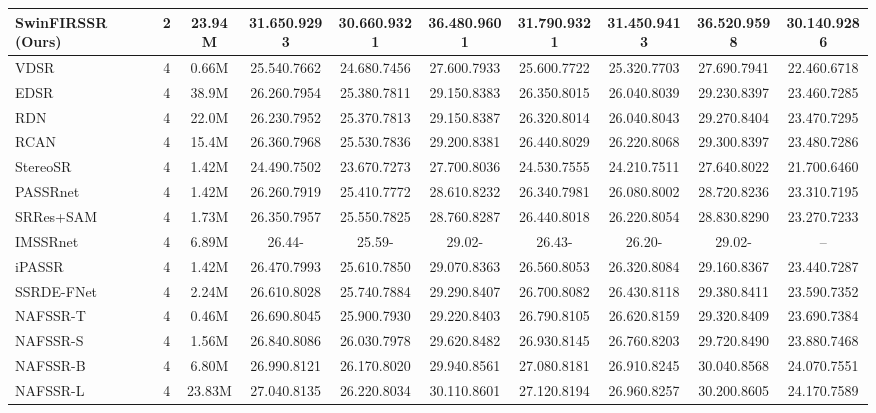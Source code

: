 \documentclass[10pt,twocolumn,letterpaper]{article}
\begin{document}
\begin{table*}[!t]
{\begin{tabular}{lccccccccc}
			\textbf{SwinFIRSSR} (Ours) & 2 & 23.94M  & {31.65}{0.9293} & {30.66}{0.9321} & {36.48}{0.9601} & {31.79}{0.9321} & {31.45}{0.9413} & {36.52}{0.9598} & {30.14}{0.9286} \\
			\midrule
			\midrule
			VDSR &  4 & 0.66M & 25.540.7662 & 24.680.7456 & 27.600.7933 & 25.600.7722 & 25.320.7703 & 27.690.7941 & 22.460.6718 \\
			EDSR &  4 & 38.9M & 26.260.7954 & 25.380.7811 & 29.15{0.8383} & 26.350.8015 & 26.040.8039 & 29.230.8397 & 23.460.7285 \\
			RDN &  4 & 22.0M  & 26.230.7952 & 25.370.7813 & 29.150.8387 & 26.320.8014 & 26.040.8043 & 29.27{0.8404} & 23.47{0.7295} \\
			RCAN &  4 & 15.4M & 26.360.7968 & 25.530.7836 & {29.20}0.8381 & 26.440.8029 & 26.220.8068 & {29.30}0.8397 & {23.48}0.7286 \\
			StereoSR  &  4 & 1.42M   & 24.490.7502 & 23.670.7273 &27.700.8036 & 24.530.7555 & 24.210.7511 & 27.640.8022 & 21.700.6460 \\
			PASSRnet  &  4 & 1.42M   & 26.260.7919 & 25.410.7772 &28.610.8232 & 26.340.7981 & 26.080.8002 & 28.720.8236 & 23.310.7195 \\
			SRRes+SAM  &  4 & 1.73M  & 26.350.7957 & 25.550.7825 & 28.760.8287 & 26.440.8018 & 26.220.8054 & 28.830.8290 & 23.270.7233 \\
			IMSSRnet &  4 & 6.89M  & 26.44- & 25.59- & 29.02- & 26.43- & 26.20- & 29.02- & -- \\
			iPASSR  &  4 & 1.42M  & {26.47}{0.7993} & {25.61}{0.7850} & 29.070.8363 & {26.56}{0.8053} & {26.32}{0.8084} & 29.160.8367 & 23.440.7287 \\
			SSRDE-FNet  & 4 & 2.24M  & {26.61}{0.8028} & {25.74}{0.7884} & {29.29}{0.8407} & {26.70}{0.8082} & {26.43}{0.8118} & {29.38}{0.8411} & {23.59}{0.7352} \\
			NAFSSR-T & 4 & 0.46M  & 26.690.8045	& 25.900.7930	 & 29.220.8403 & 26.790.8105& 26.620.8159 & 29.320.8409 & 23.690.7384\\
			NAFSSR-S & 4 & 1.56M  & {26.84}{0.8086}	& {26.03}{0.7978}	 & 29.620.8482 & {26.93}0.8145& {26.76}0.8203 & 29.720.8490 & 23.880.7468\\
			NAFSSR-B  & 4 & 6.80M  & {26.99}{0.8121} & {26.17}{0.8020} & {29.94}{0.8561} & {27.08}{0.8181} & {26.91}{0.8245} & {30.04}{0.8568} & {24.07}{0.7551} \\
			NAFSSR-L & 4 & 23.83M  & 27.04{0.8135} & {26.22}{0.8034} & {30.11}{0.8601} & {27.12}{0.8194} & {26.96}{0.8257} & {30.20}{0.8605} & {24.17}{0.7589} \\

\end{tabular}}
\end{table*}
\end{document}
